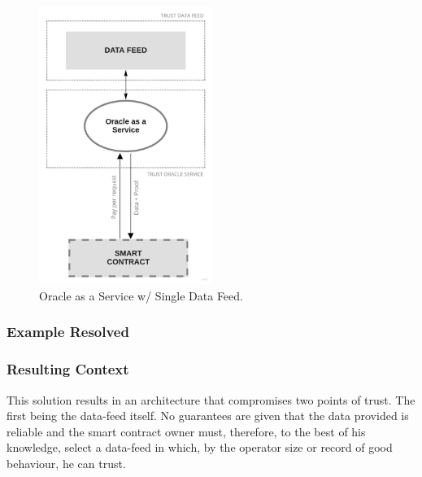 \begin{figure}[t]
  \begin{center}
    \leavevmode
    \includegraphics[width=0.5\textwidth]{figures/oraclearch1.jpg}
    \caption{Oracle as a Service w/ Single Data Feed.}
    \label{fig:/figures/paper-screening}
  \end{center}
\end{figure}

\subsubsection{Example Resolved}


\subsubsection{Resulting Context}

This solution results in an architecture that compromises two points of trust. The first being the data-feed itself. No guarantees are given that the data provided is reliable and the smart contract owner must, therefore, to the best of his knowledge, select a data-feed in which, by the operator size or record of good behaviour, he can trust.

